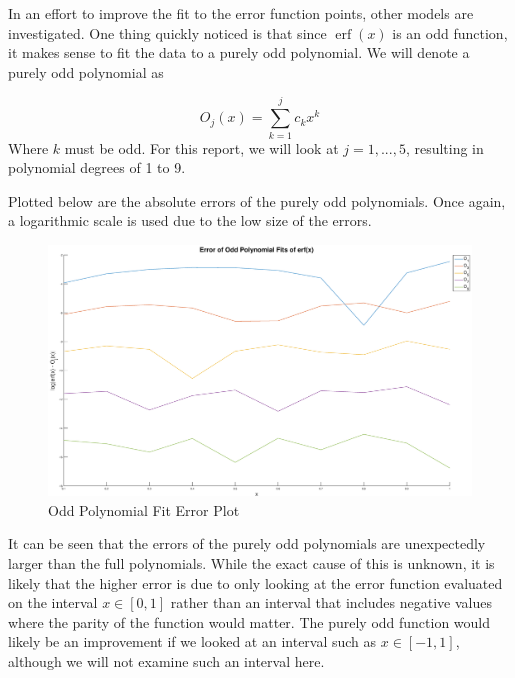 \documentclass[10pt,a4paper]{article}
\DeclareMathOperator\erf{erf}
\begin{document}
In an effort to improve the fit to the error function points, other models are investigated. One thing quickly noticed is that since $\erf{(x)}$ is an odd function, it makes sense to fit the data to a purely odd polynomial. We will denote a purely odd polynomial as

\begin{equation}
O_j(x) = \sum\limits_{k=1}^j c_k x^k
\label{eqn: odd polynomial}
\end{equation}
Where $k$ must be odd. For this report, we will look at $j = 1, ..., 5$, resulting in polynomial degrees of 1 to 9.

Plotted below are the absolute errors of the purely odd polynomials. Once again, a logarithmic scale is used due to the low size of the errors.

\begin{figure}[H]
\includegraphics[width=\linewidth]{Figures/oddpolyerror.eps}
\caption{Odd Polynomial Fit Error Plot}
\label{fig: odderror}
\end{figure}

It can be seen that the errors of the purely odd polynomials are unexpectedly larger than the full polynomials. While the exact cause of this is unknown, it is likely that the higher error is due to only looking at the error function evaluated on the interval $x \in [0,1]$ rather than an interval that includes negative values where the parity of the function would matter. The purely odd function would likely be an improvement if we looked at an interval such as $x \in [-1,1]$, although we will not examine such an interval here.
\end{document}
